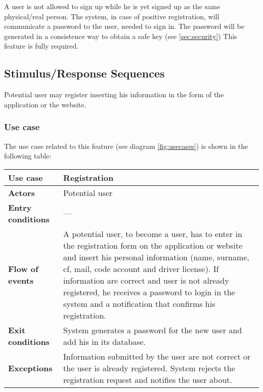 \documentclass{scrreprt}
\begin{document}
A user is not allowed to sign up while he is yet signed up as the same physical/real person. 
The system, in case of positive registration, will communicate a password to the user, needed to sign in.
The password will be generated in a consistence way to obtain a safe key (see \vref{sec:security})
This feature is fully required.
\begin{comment}$<$Provide a short description of the feature and indicate whether it is of 
High, Medium, or Low priority. You could also include specific priority 
component ratings, such as benefit, penalty, cost, and risk (each rated on a 
relative scale from a low of 1 to a high of 9).$>$
\end{comment}

\subsection{Stimulus/Response Sequences}
Potential user may register inserting his information in the form of the application or the website.

\subsubsection{Use case}

The use case related to this feature (see diagram \vref{fig:usecases}) is shown in the following table:

\begin{center}
\begin{tabularx}{\columnwidth}{>{\bfseries}lX}
\toprule
Use case & Registration\\
\midrule
Actors & Potential user\\
\midrule
Entry conditions & ---\\
\midrule
Flow of events & A potential user, to become a user, has to enter in the registration form on the application or website and insert his personal information (name, surname, cf, mail, code account and driver license). If information are correct and user is not already registered, he receives a password to login in the system and a notification that confirms his registration.\\
\midrule
Exit conditions & System generates a password for the new user and add his in its database.\\
\midrule
Exceptions & Information submitted by the user are not correct or the user is already registered. System rejects the registration request and notifies the user about.\\
\bottomrule
\end{tabularx}
\end{center}
\end{document}
